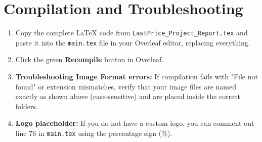 \documentclass[12pt,a4paper,oneside]{report}
\begin{document}
\section{Compilation and Troubleshooting}
\begin{enumerate}
    \item Copy the complete LaTeX code from \texttt{LastPrice\_Project\_Report.tex} and paste it into the \texttt{main.tex} file in your Overleaf editor, replacing everything.
    \item Click the green \textbf{Recompile} button in Overleaf.
    \item \textbf{Troubleshooting Image Format errors:} If compilation fails with "File not found" or extension mismatches, verify that your image files are named exactly as shown above (case-sensitive) and are placed inside the correct folders.
    \item \textbf{Logo placeholder:} If you do not have a custom logo, you can comment out line 76 in \texttt{main.tex} using the percentage sign (\%).
\end{enumerate}
\end{document}
